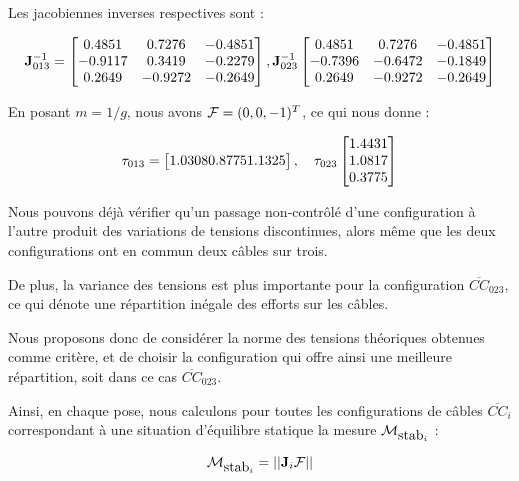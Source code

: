 Les jacobiennes inverses respectives sont :

\begin{equation}
{\bf J}^{-1}_{013} = 
\begin{bmatrix}
0.4851 & 0.7276 & -0.4851 \\
-0.9117 & 0.3419 & -0.2279 \\
0.2649 & -0.9272 & -0.2649
\end{bmatrix},
{\bf J}^{-1}_{023}
\begin{bmatrix}
0.4851 & 0.7276 & -0.4851 \\
-0.7396 & -0.6472 & -0.1849 \\
0.2649 & -0.9272 & -0.2649
\end{bmatrix}
\label{chap01:eq05}
\end{equation}

En posant $m = 1/g$, nous avons ${\boldmath {\mathcal F}} = (0, 0, -1)^T$, ce qui 
nous donne :

\begin{equation}
{\bf \tau}_{013} = 
\begin{bmatrix}
1.0308
0.8775  
1.1325
\end{bmatrix},
\quad
{\bf \tau}_{023}
\begin{bmatrix}
1.4431 \\
1.0817 \\
0.3775
\end{bmatrix}
\label{chap01:eq06}
\end{equation}

Nous pouvons d\'ej\`a v\'erifier qu'un passage non-contr\^ol\'e d'une 
configuration \`a l'autre produit des variations de tensions discontinues, 
alors m\^eme que les deux configurations ont en commun deux c\^ables sur trois.

De plus, la variance des tensions est plus importante pour la 
configuration $\overline{CC}_{023}$, ce qui dénote une répartition in\'egale des efforts sur les câbles.

Nous proposons donc de consid\'erer la norme des tensions th\'eoriques 
obtenues comme critère, et de choisir la configuration qui offre ainsi une meilleure 
r\'epartition, soit dans ce cas $\overline{CC}_{023}$.

Ainsi, en chaque pose, nous calculons pour toutes les configurations de câbles $\overline{CC}_i$ correspondant à une situation d'équilibre statique la mesure $\mathcal M_{\hbox{stab}_i}$ :

\begin{equation}
\mathcal M_{\hbox{stab}_i} = ||{\bf J}_i {\boldmath {\mathcal F}}||
\label{chap01:eq07}
\end{equation}

